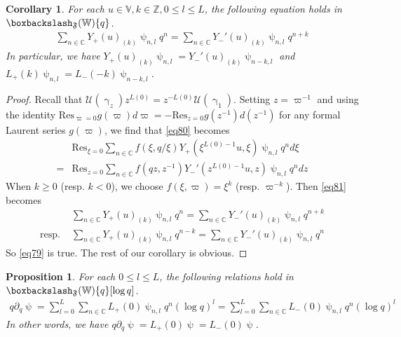 \documentclass[11pt,b5paper,notitlepage]{article}
\theoremstyle{definition}
\theoremstyle{plain}
\newtheorem{pp}[df]{Proposition}
\newtheorem{co}[df]{Corollary}
\newcommand{\Res}{\mathrm{Res}}
\newcommand{\Vbb}{\mathbb V}
\newcommand{\Wbb}{\mathbb W}
\newcommand{\Cbb}{\mathbb C}
\newcommand{\Zbb}{\mathbb Z}
\newcommand{\<}{\left\langle}
\renewcommand{\>}{\right\rangle}
\newcommand{\MU}{\mathcal{U}}
\newcommand{\bbs}{\boxbackslash}
\newcommand{\ff}{\mathfrak{F}}
\numberwithin{equation}{section}
\begin{document}
\begin{co}\label{lb29}
    For each $u\in \Vbb,k\in \Zbb,0\leq l\leq L$, the following equation holds in $\bbs_\ff(\Wbb)\{q\}$.
    \begin{align}\label{eq79}
        \sum_{n\in \Cbb} Y_+(u)_{(k)}\uppsi_{n,l}q^n =\sum_{n\in \Cbb}Y_-'(u)_{(k)}\uppsi_{n,l}q^{n+k}
    \end{align}
    In particular, we have $Y_+(u)_{(k)}\uppsi_{n,l}=Y_-'(u)_{(k)}\uppsi_{n-k,l}$ and $L_+(k)\uppsi_{n,l}=L_-(-k)\uppsi_{n-k,l}$.
\end{co}
\begin{proof}
    Recall that $\MU(\upgamma_z)z^{L(0)}=z^{-L(0)}\MU(\upgamma_1)$. Setting $z=\varpi^{-1}$ and using the identity $\Res_{\varpi=0}g(\varpi)d\varpi=-\Res_{z=0}g(z^{-1})d(z^{-1})$ for any formal Laurent series $g(\varpi)$, we find that \eqref{eq80} becomes 
    \begin{equation}\label{eq81}
        \begin{aligned}
            &\Res_{\xi=0}\sum_{n\in \Cbb} f(\xi,q/\xi)Y_+(\xi^{L(0)-1}u,\xi)\uppsi_{n,l}q^n d\xi\\
            =&\Res_{z=0}\sum_{n\in \Cbb}f(qz,z^{-1})Y_-'(z^{L(0)-1}u,z)\uppsi_{n,l}q^n dz
        \end{aligned}
    \end{equation}
    When $k\geq 0$ (resp. $k<0$), we choose $f(\xi,\varpi)=\xi^k$ (resp. $\varpi^{-k}$). Then \eqref{eq81} becomes 
    \begin{align*}
        &\sum_{n\in \Cbb} Y_+(u)_{(k)}\uppsi_{n,l}q^n =\sum_{n\in \Cbb}Y_-'(u)_{(k)}\uppsi_{n,l}q^{n+k}\\
        \text{resp. }&\sum_{n\in \Cbb} Y_+(u)_{(k)}\uppsi_{n,l}q^{n-k} =\sum_{n\in \Cbb}Y_-'(u)_{(k)}\uppsi_{n,l}q^{n}
    \end{align*}
    So \eqref{eq79} is true. The rest of our corollary is obvious.
\end{proof}



\begin{pp}\label{lb27}
For each $0\leq l\leq L$, the following relations hold in $\bbs_\ff(\Wbb)\{q\}[\log q]$.
    \begin{align}\label{eq57}
        q\partial_q \uppsi=\sum_{l=0}^L\sum_{n\in \Cbb}L_+(0)\uppsi_{n,l}q^n (\log q)^l=\sum_{l=0}^L\sum_{n\in \Cbb}L_-(0)\uppsi_{n,l}q^n (\log q)^l
    \end{align}
In other words, we have $q\partial_q\uppsi=L_+(0)\uppsi=L_-(0)\uppsi$.
\end{pp}
\end{document}
